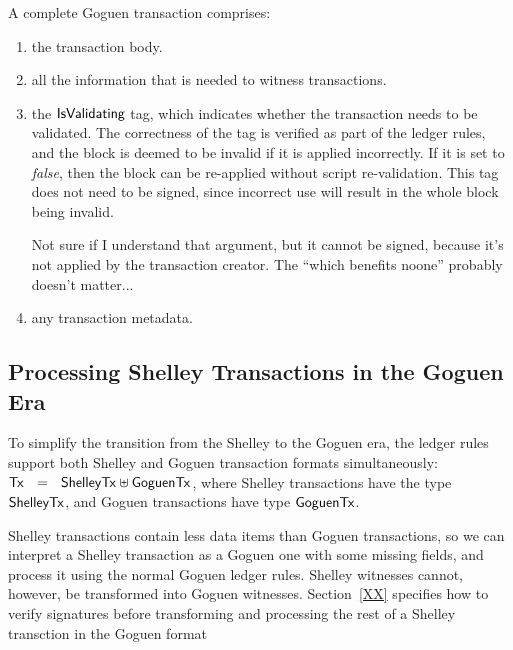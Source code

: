 A complete Goguen transaction comprises:

\begin{enumerate}
  \item the transaction body.
  \item all the information that is needed to witness transactions.
  \item the $\mathsf{IsValidating}$ tag, which indicates whether the transaction needs to be validated.
  The correctness of the tag is verified as part of the ledger rules, and the block is
  deemed to be invalid if it is applied incorrectly.
  If it is set to \emph{false}, then the block can be re-applied without script re-validation.
  This tag does not need to be signed, since incorrect use will result
  in the whole block being invalid.
  \begin{note}
    Not sure if I understand that argument, but it cannot be signed,
    because it's not applied by the transaction creator.
    The ``which benefits noone'' probably doesn't matter...
  \end{note}
  \item any transaction metadata.
\end{enumerate}


\subsection{Processing Shelley Transactions in the Goguen Era}

To simplify the transition from the Shelley to the Goguen era, the ledger rules support both Shelley and Goguen transaction formats simultaneously:
$\mathsf{Tx} ~~=~~ \mathsf{ShelleyTx} \uplus \mathsf{GoguenTx}$, where Shelley transactions have the type $\mathsf{ShelleyTx}$, and  Goguen transactions have type $\mathsf{GoguenTx}$.
%

Shelley transactions contain less data items than Goguen transactions, so we can interpret
a Shelley transaction as a Goguen one with some missing fields, and process it using the normal Goguen ledger
rules.  Shelley witnesses cannot, however, be transformed into Goguen witnesses.
Section~\ref{XX} specifies how to verify signatures before transforming
and processing
the rest of a Shelley transction in the Goguen format

